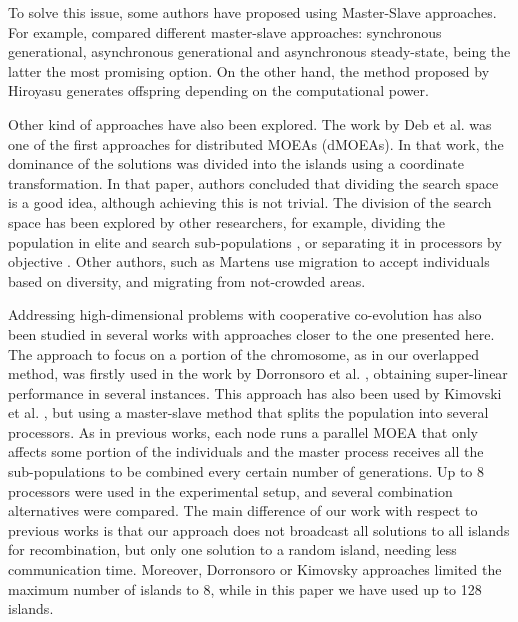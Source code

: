 \documentclass[preprint]{elsarticle}
\begin{document}
To solve this issue, some authors have proposed using Master-Slave approaches. For example,  \citep{Durillo08masterslave} compared different master-slave approaches: synchronous generational, asynchronous generational and asynchronous steady-state, being the latter the most promising option. On the other hand, the method proposed by Hiroyasu \citep{Hiroyasu07discussion} generates offspring depending on the computational power.

Other kind of approaches have also been explored. The work by Deb et al. \citep{Deb03distributed} was one of the first approaches for distributed MOEAs (dMOEAs). In that work, the dominance of the solutions was divided into the islands using a coordinate transformation. In that paper, authors concluded that dividing the search space is a good idea, although achieving this is not trivial. The division of the search space has been explored by other researchers, for example, dividing the population in elite and search sub-populations \citep{Wang09parallel}, or separating it in processors by objective \citep{Xiao03specialized}. Other authors, such as Martens \citep{Martens13asynchronous} use migration to accept individuals based on diversity, and migrating from not-crowded areas.

Addressing high-dimensional problems with cooperative co-evolution has
also been studied in several works with approaches closer to the one
presented here. The approach to focus on a portion of the chromosome,
as in our overlapped method, was firstly used in the work by
Dorronsoro et al. \citep{Dorronsoro13superlinear}, obtaining
super-linear performance 
in several instances. This approach has also been used by Kimovski et al. \citep{Kimovski15Parallel}, but using a
master-slave method that splits the population into several processors. As in previous works, each node
runs a parallel MOEA that only affects some portion of 
the individuals and the master
process receives all the sub-populations to be combined every certain number of generations. Up to 8 processors
were used in the experimental setup, and several
combination alternatives were compared. The main difference of our work with respect to previous works is that our approach does not 
broadcast all solutions to all islands for recombination, but only one solution to a random island, needing less
communication time. Moreover, Dorronsoro or Kimovsky approaches limited the maximum number of islands to 8, while in this paper we have
used up to 128 islands. 
\end{document}
